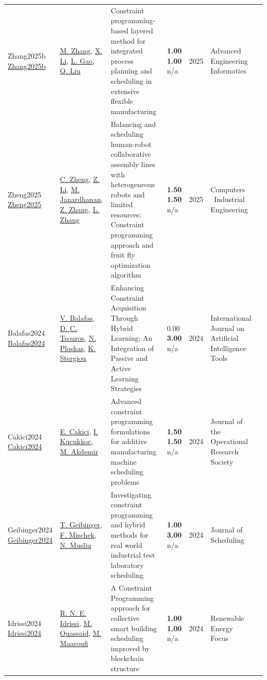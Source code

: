 {\begin{longtable}{p{3cm}p{5cm}p{10cm}p{1cm}rp{2.5cm}l}
Zhang2025b \href{https://doi.org/10.1016/j.aei.2025.103210}{Zhang2025b} & \hyperref[auth:a2180]{M. Zhang}, \hyperref[auth:a2181]{X. Li}, \hyperref[auth:a1972]{L. Gao}, \hyperref[auth:a2182]{Q. Liu} & Constraint programming-based layered method for integrated process planning and scheduling in extensive flexible manufacturing & \noindent{}\textbf{1.00} \textbf{1.00} n/a & 2025 & Advanced Engineering Informatics & \cite{Zhang2025b}\\
Zheng2025 \href{https://doi.org/10.1016/j.cie.2025.111046}{Zheng2025} & \hyperref[auth:a2158]{C. Zheng}, \hyperref[auth:a1381]{Z. Li}, \hyperref[auth:a2159]{M. Janardhanan}, \hyperref[auth:a2160]{Z. Zhang}, \hyperref[auth:a2161]{L. Zhang} & Balancing and scheduling human-robot collaborative assembly lines with heterogeneous robots and limited resources: Constraint programming approach and fruit fly optimization algorithm & \noindent{}\textbf{1.50} \textbf{1.50} n/a & 2025 & Computers \  Industrial Engineering & \cite{Zheng2025}\\
Balafas2024 \href{https://doi.org/10.1142/s0218213024500209}{Balafas2024} & \hyperref[auth:a2116]{V. Balafas}, \hyperref[auth:a2117]{D. C. Tsouros}, \hyperref[auth:a2118]{N. Ploskas}, \hyperref[auth:a1998]{K. Stergiou} & Enhancing Constraint Acquisition Through Hybrid Learning: An Integration of Passive and Active Learning Strategies & \noindent{}\textcolor{black!50}{0.00} \textbf{3.00} n/a & 2024 & International Journal on Artificial Intelligence Tools & \cite{Balafas2024}\\
Cakici2024 \href{https://doi.org/10.1080/01605682.2024.2382867}{Cakici2024} & \hyperref[auth:a874]{E. Cakici}, \hyperref[auth:a2166]{I. Kucukkoc}, \hyperref[auth:a2167]{M. Akdemir} & Advanced constraint programming formulations for additive manufacturing machine scheduling problems & \noindent{}\textbf{1.50} \textbf{1.50} n/a & 2024 & \cellcolor{red!20}Journal of the Operational Research Society & \cite{Cakici2024}\\
Geibinger2024 \href{https://doi.org/10.1007/s10951-024-00821-0}{Geibinger2024} & \hyperref[auth:a77]{T. Geibinger}, \hyperref[auth:a80]{F. Mischek}, \hyperref[auth:a45]{N. Musliu} & \cellcolor{gold!20}Investigating constraint programming and hybrid methods for real world industrial test laboratory scheduling & \noindent{}\textbf{1.00} \textbf{3.00} n/a & 2024 & Journal of Scheduling & \cite{Geibinger2024}\\
Idrissi2024 \href{https://doi.org/10.1016/j.ref.2024.100571}{Idrissi2024} & \hyperref[auth:a2177]{R. N. E. Idrissi}, \hyperref[auth:a2178]{M. Ouassaid}, \hyperref[auth:a2179]{M. Maaroufi} & A Constraint Programming approach for collective smart building scheduling improved by blockchain structure & \noindent{}\textbf{1.00} \textbf{1.00} n/a & 2024 & Renewable Energy Focus & \cite{Idrissi2024}\\

\end{longtable}}
